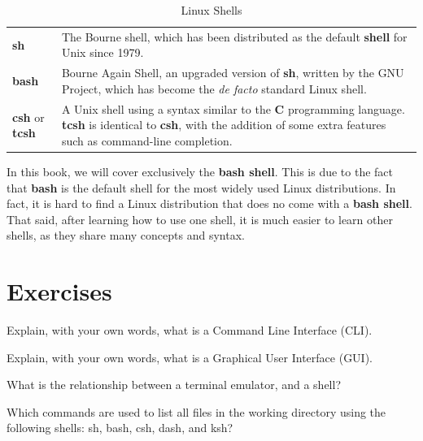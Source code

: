 \begin{table}[!htbp]
   \myfloatalign
   \begin{tabularx}{\textwidth}{Xp{90mm}} \toprule
   \textbf{sh} & The Bourne shell, which has been distributed as the default \textbf{shell} for Unix since 1979. \\
   \textbf{bash} & Bourne Again Shell, an upgraded version of \textbf{sh}, written by the GNU Project, which has become the \textit{de facto} standard Linux shell. \\
   \textbf{csh} or \textbf{tcsh} & A Unix shell using a syntax similar to the \textbf{C} programming language. \textbf{tcsh} is identical to \textbf{csh}, with the addition of some extra features such as command-line completion.\\
   \bottomrule
   \end{tabularx}
\caption{Linux Shells}
\label{tab:ch1_shells}
\end{table}

In this book, we will cover exclusively the \textbf{bash shell}. This is due to the fact that \textbf{bash} is the default shell for the most widely used Linux distributions. In fact, it is hard to find a Linux distribution that does no come with a \textbf{bash shell}. That said, after learning how to use one shell, it is much easier to learn other shells, as they share many concepts and syntax.

\section*{Exercises}

\begin{exercises}
   \item Explain, with your own words, what is a Command Line Interface (\acs{CLI}).
   \item Explain, with your own words, what is a Graphical User Interface (\acs{GUI}).
   \item What is the relationship between a terminal emulator, and a shell?
   \item Which commands are used to list all files in the working directory using the following shells: sh, bash, csh, dash, and ksh?
\end{exercises}
